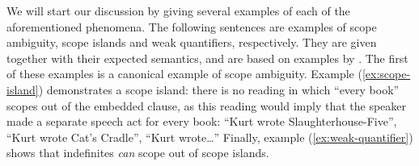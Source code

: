 \documentclass[10pt,a4paper]{llncs}
\begin{document}
We will start our discussion by giving several examples of each of the
aforementioned phenomena. The following sentences are examples of scope
ambiguity, scope islands and weak quantifiers, respectively. They are
given together with their expected semantics, and are based on
examples by \citet[][p.\ 608, 622]{szabolcsi2000}.
The first of these examples is a canonical example of scope
ambiguity.
%
Example (\ref{ex:scope-island}) demonstrates a scope
island: there is no reading in which ``every book'' scopes out of the
embedded clause, as this reading would imply that the speaker made a
separate speech act for every book: ``Kurt wrote
Slaughterhouse-Five'', ``Kurt wrote Cat's Cradle'', ``Kurt
wrote\ldots''
%
Finally, example (\ref{ex:weak-quantifier}) shows that
indefinites \emph{can} scope out of scope islands.
\end{document}
